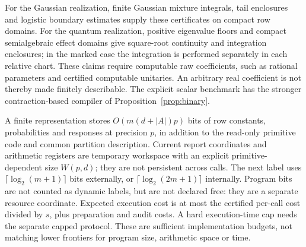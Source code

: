 For the Gaussian realization, finite Gaussian mixture integrals, tail enclosures and logistic boundary estimates supply these certificates on compact row domains. For the quantum realization, positive eigenvalue floors and compact semialgebraic effect domains give square-root continuity and integration enclosures; in the marked case the integration is performed separately in each relative chart. These claims require computable raw coefficients, such as rational parameters and certified computable unitaries. An arbitrary real coefficient is not thereby made finitely describable. The explicit scalar benchmark has the stronger contraction-based compiler of Proposition~\ref{prop:binary}.

A finite representation stores $O(m(d+|A|)p)$ bits of row constants, probabilities and responses at precision $p$, in addition to the read-only primitive code and common partition description. Current report coordinates and arithmetic registers are temporary workspace with an explicit primitive-dependent size $W(p,d)$; they are not persistent across calls. The next label uses $\lceil\log_2(m+1)\rceil$ bits externally, or $\lceil\log_2(2m+1)\rceil$ internally. Program bits are not counted as dynamic labels, but are not declared free: they are a separate resource coordinate. Expected execution cost is at most the certified per-call cost divided by $s$, plus preparation and audit costs. A hard execution-time cap needs the separate capped protocol. These are sufficient implementation budgets, not matching lower frontiers for program size, arithmetic space or time.
